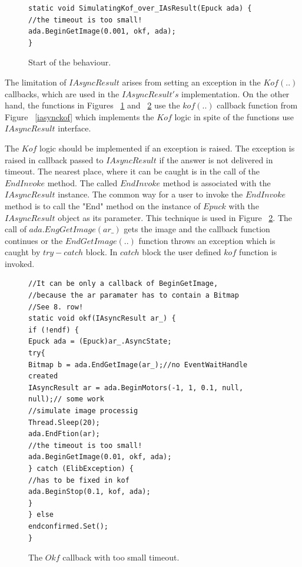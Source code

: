 \begin{figure}[!hbp]
\begin{lstlisting}
static void SimulatingKof_over_IAsResult(Epuck ada) {
//the timeout is too small!
ada.BeginGetImage(0.001, okf, ada);
}
\end{lstlisting}
\caption{Start of the behaviour.}
\label{c:start}
\end{figure}

  The limitation of $IAsyncResult$ arises from setting an exception in the $Kof(..)$ callbacks,
  which are used in the $IAsyncResult's$ implementation.
  On the other hand, the functions in Figures ~\ref{c:start} and ~\ref{c:okfsim} use the $kof(..)$ callback function
  from Figure ~\ref{iasynckof} 
  which implements the $Kof$ logic in spite of the functions use $IAsyncResult$ interface.

  The $Kof$ logic should be implemented if an exception is raised. 
  The exception is raised in callback passed to $IAsyncResult$ if the answer is not delivered in timeout. 
  The nearest place, where it can be caught is in the call of the $EndInvoke$ method.
  The called $EndInvoke$ method is associated with the $IAsyncResult$ instance. 
  The common way for a user to invoke the $EndInvoke$ method is to call the "End" method 
  on the instance of $Epuck$ with the $IAsyncResult$ object as its parameter. 
  This technique is used in Figure ~\ref{c:okfsim}.
  The call of $ada.EngGetImage(ar\_)$ gets the image and the callback function continues
  or the $EndGetImage(..)$ function throws an exception which is caught by $try-catch$ block.
  In $catch$ block the user defined $kof$ function is invoked.
  
\begin{figure}[!hbp]
\begin{lstlisting}
//It can be only a callback of BeginGetImage,
//because the ar paramater has to contain a Bitmap
//See 8. row!
static void okf(IAsyncResult ar_) {
if (!endf) {
Epuck ada = (Epuck)ar_.AsyncState;
try{
Bitmap b = ada.EndGetImage(ar_);//no EventWaitHandle created
IAsyncResult ar = ada.BeginMotors(-1, 1, 0.1, null, null);// some work
//simulate image processig
Thread.Sleep(20);
ada.EndFtion(ar);
//the timeout is too small!
ada.BeginGetImage(0.01, okf, ada);
} catch (ElibException) {
//has to be fixed in kof
ada.BeginStop(0.1, kof, ada);
}
} else
endconfirmed.Set();
}
\end{lstlisting}
\caption{The $Okf$ callback with too small timeout.}
\label{c:okfsim}
\end{figure}

